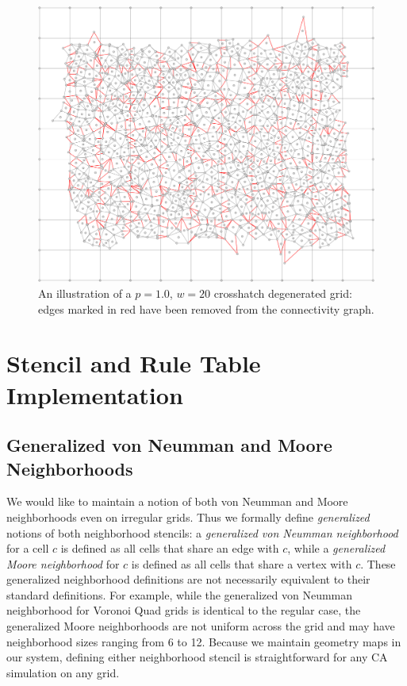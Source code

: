 \documentclass[a4paper,11pt,twoside]{report}
\begin{document}
\begin{figure}[htp]
\centering
\includegraphics[width=1.0\textwidth]{ch3_figs/ch_p100_w20}
\caption[Crosshatching Degeneration]{
	An illustration of a $p=1.0$, $w=20$ crosshatch degenerated grid: edges marked in red have been removed from the connectivity graph.
}
\label{fig:crosshatch_degen}
\end{figure}

\section{Stencil and Rule Table Implementation}
\label{sec:StencilGen}
\subsection{Generalized von Neumman and Moore Neighborhoods}
We would like to maintain a notion of both von Neumman and Moore neighborhoods even on irregular grids. Thus we formally define \textit{generalized} notions of both neighborhood stencils: a \textit{generalized von Neumman neighborhood} for a cell $c$ is defined as all cells that share an edge with $c$, while a \textit{generalized Moore neighborhood} for $c$ is defined as all cells that share a vertex with $c$. These generalized neighborhood definitions are not necessarily equivalent to their standard definitions. For example, while the generalized von Neumman neighborhood for Voronoi Quad grids is identical to the regular case, the generalized Moore neighborhoods are not uniform across the grid and may have neighborhood sizes ranging from 6 to 12. Because we maintain geometry maps in our system, defining either neighborhood stencil is straightforward for any CA simulation on any grid.
\end{document}
